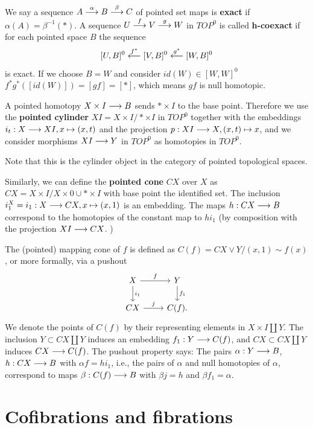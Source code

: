 \documentclass[11pt]{book} %
\begin{document}
We say a sequence $A\overset{\alpha}{\longrightarrow} B\overset{\beta}{\longrightarrow} C$ of pointed set maps is \textbf{exact} if $\alpha(A)=\beta^{-1}(*)$. A sequence $U\overset{f}{\longrightarrow} V\overset{g}{\longrightarrow} W$ in $TOP^0$ is called \textbf{h-coexact} if for each  pointed space $B$ the sequence
$$
[U,B]^0\overset{f^*}{\longleftarrow}[V,B]^0\overset{g^*}{\longleftarrow}[W,B]^0
$$
is exact. If we choose $B=W$ and consider $id(W)\in[W,W]^0$ $f^*g^*([id(W)])=[gf]=[*]$, which means $gf$ is null homotopic.

A pointed homotopy $X\times I\longrightarrow B$ sends $*\times I$ to the base point. Therefore we use the \textbf{pointed cylinder} $XI=X\times I/*\times I$ in $TOP^0$ together with the embeddings $i_t: X\longrightarrow XI, x\mapsto (x,t)$ and the projection $p: XI\longrightarrow X, (x,t)\mapsto x$, and we consider morphisms $XI\longrightarrow Y$ in $TOP^0$ as homotopies in $TOP^0$.

Note that this is the cylinder object in the category of pointed topological spaces.

Similarly, we can define the \textbf{pointed cone} $CX$ over $X$ as $CX=X\times I/X\times 0\cup *\times I$ with base point the identified set. The inclusion $i_1^X=i_1: X\longrightarrow CX, x\mapsto (x,1)$ is an embedding. The maps $h: CX\longrightarrow B$ correspond to the homotopies of the constant map to $hi_1$ (by composition with the projection $XI\longrightarrow CX$.
)

The (pointed) mapping cone of $f$ is defined as $C(f)=CX\vee Y/(x,1)\sim f(x)$, or more formally, via a pushout
$$
\begin{tikzcd}
X \arrow[r, "f"] \arrow[d, "i_1"] & Y \arrow[d, "f_1"] \\
CX \arrow[r, "j"] & C(f).
\end{tikzcd}
$$
We denote the points of $C(f)$ by their representing elements in $X\times I \coprod Y$. The inclusion $Y\subset CX\coprod Y$ induces an embedding $f_1: Y\longrightarrow C(f)$, and $CX\subset CX\coprod Y$ induces $CX\longrightarrow C(f)$. The pushout property says: The pairs $\alpha: Y\longrightarrow B$, $h: CX\longrightarrow B$ with $\alpha f=h i_1$, i.e., the pairs of $\alpha$ and null homotopies of $\alpha$, correspond to maps $\beta:C(f)\longrightarrow B$ with $\beta j=h$ and $\beta f_1=\alpha$.






\chapter{Cofibrations and fibrations}
\end{document}
